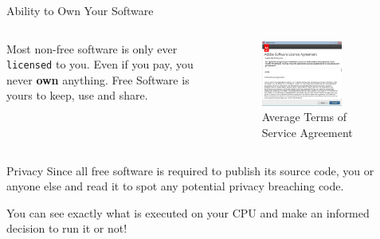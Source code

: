 \documentclass{beamer}
\begin{document}
\begin{frame}{Ability to Own Your Software}
	\begin{columns}
		\begin{column}{0.5\textwidth}
			Most non-free software is only ever \texttt{licensed} to you. Even if
			you pay, you never \textbf{own} anything. Free Software is yours to
			keep, use and share.
		\end{column}
		\begin{column}{0.5\textwidth}
			\begin{figure}
				\centering
				\includegraphics[width=0.7\textwidth]{adobe.png}
				\caption{Average Terms of Service Agreement\footnotemark}
			\end{figure}
		\end{column}
	\end{columns}

\end{frame}

\begin{frame}{Privacy}
	Since all free software is required to publish its source code, you or
	anyone else and read it to spot any potential privacy breaching code.

	\pause

You can see exactly what is executed on your CPU and make an informed decision
	to run it or not!
\end{frame}
\end{document}
